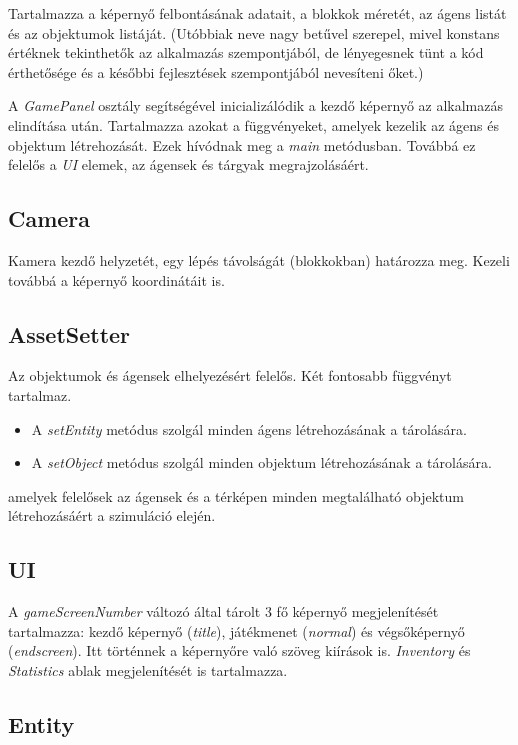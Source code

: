 Tartalmazza a képernyő felbontásának adatait, a blokkok méretét, az ágens listát és az objektumok listáját. (Utóbbiak neve nagy betűvel szerepel, mivel konstans értéknek tekinthetők az alkalmazás szempontjából, de lényegesnek tünt a kód érthetősége és a későbbi fejlesztések szempontjából nevesíteni őket.)

A \textit{GamePanel} osztály segítségével inicializálódik a kezdő képernyő az alkalmazás elindítása után.
Tartalmazza azokat a függvényeket, amelyek kezelik az ágens és objektum létrehozását. Ezek hívódnak meg a \textit{main} metódusban. Továbbá ez felelős a \textit{UI} elemek, az ágensek és tárgyak megrajzolásáért.

\subsection{Camera}

Kamera kezdő helyzetét, egy lépés távolságát (blokkokban) határozza meg.
Kezeli továbbá a képernyő koordinátáit is.

\subsection{AssetSetter}

Az objektumok és ágensek elhelyezésért felelős.
Két fontosabb függvényt tartalmaz.
\begin{itemize}
    \item A \textit{setEntity} metódus szolgál minden ágens létrehozásának a tárolására.
    \item A \textit{setObject} metódus szolgál minden objektum létrehozásának a tárolására.
\end{itemize}

amelyek felelősek az ágensek és a térképen minden megtalálható objektum létrehozásáért a szimuláció elején.

\subsection{UI}

A \textit{gameScreenNumber} változó által tárolt 3 fő képernyő megjelenítését tartalmazza: kezdő képernyő (\textit{title}),
játékmenet (\textit{normal}) és végsőképernyő (\textit{endscreen}).
Itt történnek a képernyőre való szöveg kiírások is.
\textit{Inventory} és \textit{Statistics} ablak megjelenítését is tartalmazza.

\subsection{Entity}

